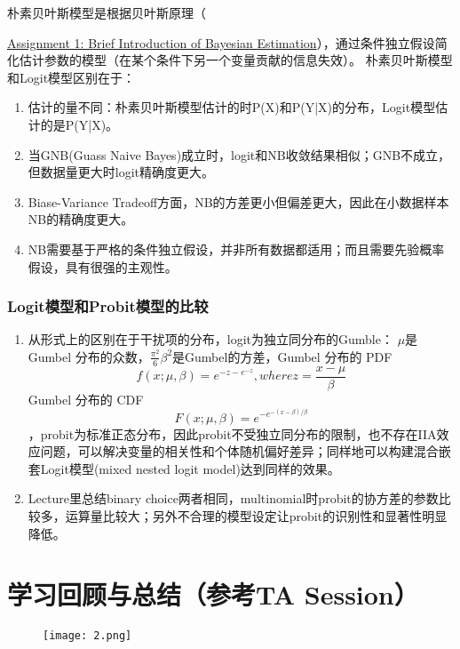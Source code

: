 \documentclass[cn]{elegantpaper}
\begin{document}
朴素贝叶斯模型是根据贝叶斯原理（{\href{https://ywt26.github.io/MicroecoAssign/Microeco_hw1_WeitongYao.pdf}{Assignment 1: Brief Introduction of Bayesian Estimation}），通过条件独立假设简化估计参数的模型（在某个条件下另一个变量贡献的信息失效）。
朴素贝叶斯模型和Logit模型区别在于：
\begin{enumerate}
\item{估计的量不同：朴素贝叶斯模型估计的时P(X)和P(Y|X)的分布，Logit模型估计的是P(Y|X)。}
\item{当GNB(Guass Naive Bayes)成立时，logit和NB收敛结果相似；GNB不成立，但数据量更大时logit精确度更大。}
\item {Biase-Variance Tradeoff方面，NB的方差更小但偏差更大，因此在小数据样本NB的精确度更大。}
\item {NB需要基于严格的条件独立假设，并非所有数据都适用；而且需要先验概率假设，具有很强的主观性。}
\end{enumerate}
\subsubsection{Logit模型和Probit模型的比较}
\begin{enumerate}
\item {从形式上的区别在于干扰项的分布，logit为独立同分布的Gumble：
$\mu$是Gumbel 分布的众数，$\frac{\pi^2}{6}$$\beta^2$是Gumbel的方差，Gumbel 分布的 PDF
\begin{equation} 
f(x;\mu,\beta)= e^{-z-e^{-z}},where z = \frac{x-\mu}{\beta}
\end{equation}
Gumbel 分布的 CDF
\begin{equation} 
F(x;\mu,\beta)= e^{-e^{-(x-\beta)/\beta}}
\end{equation}
，probit为标准正态分布，因此probit不受独立同分布的限制，也不存在IIA效应问题，可以解决变量的相关性和个体随机偏好差异；同样地可以构建混合嵌套Logit模型(mixed nested logit model)达到同样的效果。}
\item {Lecture里总结binary choice两者相同，multinomial时probit的协方差的参数比较多，运算量比较大；另外不合理的模型设定让probit的识别性和显著性明显降低。}
\end{enumerate}

\section{学习回顾与总结（参考TA Session）}
\begin{figure}[H]
	\centering
	\texttt{[image: 2.png]}
\end{figure}


}
\end{document}
